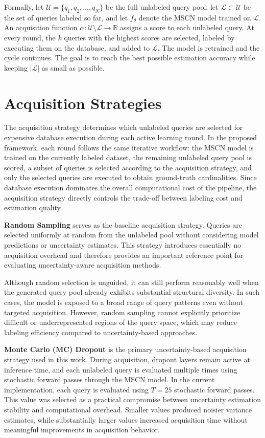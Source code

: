 Formally, let $\mathcal{U} = \{q_1, q_2, \ldots, q_N\}$ be the full unlabeled query pool, let $\mathcal{L} \subset \mathcal{U}$ be the set of queries labeled so far, and let $f_\theta$ denote the MSCN model trained on $\mathcal{L}$. An acquisition function $\alpha: \mathcal{U} \setminus \mathcal{L} \rightarrow \mathbb{R}$ assigns a score to each unlabeled query. At every round, the $k$ queries with the highest scores are selected, labeled by executing them on the database, and added to $\mathcal{L}$. The model is retrained and the cycle continues. The goal is to reach the best possible estimation accuracy while keeping $|\mathcal{L}|$ as small as possible.


\section{Acquisition Strategies}

The acquisition strategy determines which unlabeled queries are selected for expensive database execution during each active learning round. In the proposed framework, each round follows the same iterative workflow: the MSCN model is trained on the currently labeled dataset, the remaining unlabeled query pool is scored, a subset of queries is selected according to the acquisition strategy, and only the selected queries are executed to obtain ground-truth cardinalities. Since database execution dominates the overall computational cost of the pipeline, the acquisition strategy directly controls the trade-off between labeling cost and estimation quality.

\textbf{Random Sampling} serves as the baseline acquisition strategy. Queries are selected uniformly at random from the unlabeled pool without considering model predictions or uncertainty estimates. This strategy introduces essentially no acquisition overhead and therefore provides an important reference point for evaluating uncertainty-aware acquisition methods.

Although random selection is unguided, it can still perform reasonably well when the generated query pool already exhibits substantial structural diversity. In such cases, the model is exposed to a broad range of query patterns even without targeted acquisition. However, random sampling cannot explicitly prioritize difficult or underrepresented regions of the query space, which may reduce labeling efficiency compared to uncertainty-based approaches.

\textbf{Monte Carlo (MC) Dropout} is the primary uncertainty-based acquisition strategy used in this work. During acquisition, dropout layers remain active at inference time, and each unlabeled query is evaluated multiple times using stochastic forward passes through the MSCN model. In the current implementation, each query is evaluated using $T = 25$ stochastic forward passes. This value was selected as a practical compromise between uncertainty estimation stability and computational overhead. Smaller values produced noisier variance estimates, while substantially larger values increased acquisition time without meaningful improvements in acquisition behavior.

